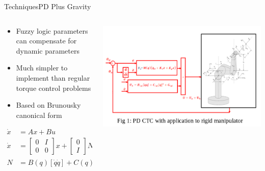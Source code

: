\documentclass{beamer}
\begin{document}
\begin{frame}{Techniques}{PD Plus Gravity\cite{piltan}}
\begin{columns}
    \begin{column}{0.47\textwidth}
        \begin{itemize}
			\item Fuzzy logic parameters can compensate for dynamic parameters
			\item Much simpler to implement than regular torque control problems
			\item Based on Brunousky canonical form
        \end{itemize}
        \begin{align*}
        	\dot{x} &= Ax + Bu \\
        	\dot{x} &= \begin{bmatrix}
        	0 & I \\ 0 & 0
        	\end{bmatrix}x + \begin{bmatrix}
        	0 \\ I
        	\end{bmatrix}N \\
        	N &= B(q)[\dot{q}\dot{q}] + C(q)[\dot{q}]^2 + G(q)
        \end{align*}
    \end{column}
    \begin{column}{0.5\textwidth}
        \includegraphics[scale=.2]{./images/pd_ctc_application.png}
    \end{column}
\end{columns}
\end{frame}
\end{document}
